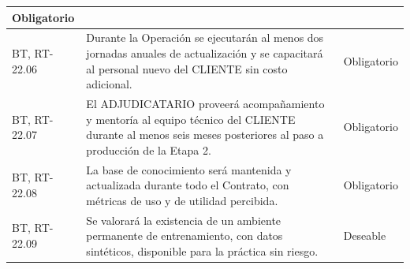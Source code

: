 \begin{longtable}{|L{0.098425\AnchoTablaAnexo}|L{0.814961\AnchoTablaAnexo}|L{0.086614\AnchoTablaAnexo}|}
Obligatorio \\ \hline
BT, RT-22.06 &
Durante la Operación se ejecutarán al menos dos jornadas anuales de actualización y se capacitará al personal nuevo del CLIENTE sin costo adicional. &
Obligatorio \\ \hline
{}
BT, RT-22.07 &
El ADJUDICATARIO proveerá acompañamiento y mentoría al equipo técnico del CLIENTE durante al menos seis meses posteriores al paso a producción de la Etapa 2. &
Obligatorio \\ \hline
BT, RT-22.08 &
La base de conocimiento será mantenida y actualizada durante todo el Contrato, con métricas de uso y de utilidad percibida. &
Obligatorio \\ \hline
{}
BT, RT-22.09 &
Se valorará la existencia de un ambiente permanente de entrenamiento, con datos sintéticos, disponible para la práctica sin riesgo. &
Deseable \\ \hline
\end{longtable}

